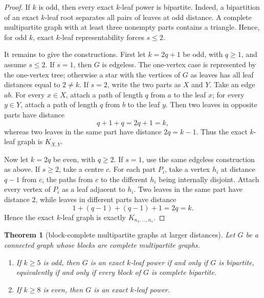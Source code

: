 \documentclass[11pt]{article}
\newtheorem{theorem}{Theorem}[section]
\theoremstyle{definition}
\begin{document}
\begin{proof}
If $k$ is odd, then every exact $k$-leaf power is bipartite.  Indeed, a bipartition of an exact $k$-leaf root separates all pairs of leaves at odd distance.  A complete multipartite graph with at least three nonempty parts contains a triangle.  Hence, for odd $k$, exact $k$-leaf representability forces $s\le2$.

It remains to give the constructions.  First let $k=2q+1$ be odd, with $q\ge1$, and assume $s\le2$.  If $s=1$, then $G$ is edgeless.  The one-vertex case is represented by the one-vertex tree; otherwise a star with the vertices of $G$ as leaves has all leaf distances equal to $2\ne k$.  If $s=2$, write the two parts as $X$ and $Y$.  Take an edge $ab$.  For every $x\in X$, attach a path of length $q$ from $a$ to the leaf $x$; for every $y\in Y$, attach a path of length $q$ from $b$ to the leaf $y$.  Then two leaves in opposite parts have distance
\[
 q+1+q=2q+1=k,
\]
whereas two leaves in the same part have distance $2q=k-1$.  Thus the exact $k$-leaf graph is $K_{X,Y}$.

Now let $k=2q$ be even, with $q\ge2$.  If $s=1$, use the same edgeless construction as above.  If $s\ge2$, take a centre $c$.  For each part $P_i$, take a vertex $h_i$ at distance $q-1$ from $c$, the paths from $c$ to the different $h_i$ being internally disjoint.  Attach every vertex of $P_i$ as a leaf adjacent to $h_i$.  Two leaves in the same part have distance $2$, while leaves in different parts have distance
\[
 1+(q-1)+(q-1)+1=2q=k.
\]
Hence the exact $k$-leaf graph is exactly $K_{n_1,\ldots,n_s}$.
\end{proof}

\begin{theorem}[block-complete multipartite graphs at larger distances]\label{thm:block-complete-larger-k}
Let $G$ be a connected graph whose blocks are complete multipartite graphs.
\begin{enumerate}[label=\textup{(\roman*)}]
\item If $k\ge5$ is odd, then $G$ is an exact $k$-leaf power if and only if $G$ is bipartite, equivalently if and only if every block of $G$ is complete bipartite.
\item If $k\ge8$ is even, then $G$ is an exact $k$-leaf power.
\end{enumerate}
\end{theorem}
\end{document}
